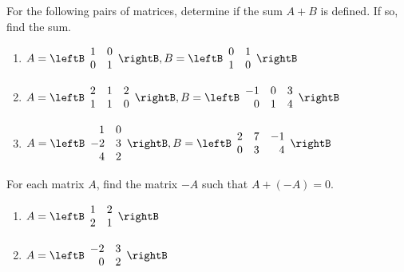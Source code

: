 \begin{enumialphparenastyle}

\begin{ex} For the following pairs of matrices, determine if the sum $A + B$ is defined. If so, find the sum. 
\begin{enumerate}
\item
$A = \leftB \begin{array}{rr}
1 & 0 \\
0 & 1 
\end{array} \rightB, 
B = \leftB \begin{array}{rr}
0 & 1 \\
1 & 0 
\end{array} \rightB$

\item
$A = \leftB \begin{array}{rrr}
2 & 1 & 2 \\
1 & 1 & 0 
\end{array} \rightB,  B = \leftB \begin{array}{rrr}
-1 & 0 & 3\\
0 & 1 & 4 
\end{array} \rightB$

\item 
$A = \leftB \begin{array}{rr}
1 & 0 \\
-2 & 3 \\
4 & 2 
\end{array} \rightB, B = \leftB \begin{array}{rrr}
2 & 7 & -1 \\
0 & 3 & 4  
\end{array} \rightB$
\end{enumerate}
\end{ex}

\begin{ex} For each matrix $A$, find the matrix $-A$ such that $A + (-A) = 0$. 
\begin{enumerate}
\item
$A = \leftB \begin{array}{rr}
1 & 2 \\
2 & 1 
\end{array} \rightB$

\item
$A = \leftB \begin{array}{rr}
-2 & 3 \\
0 & 2 
\end{array} \rightB$


\end{enumerate}
\end{ex}
\end{enumialphparenastyle}
